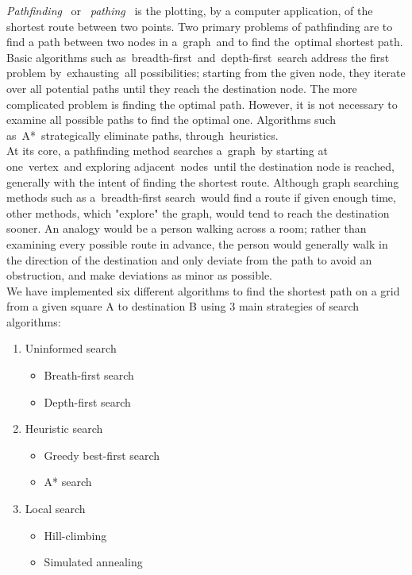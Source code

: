 \documentclass[a4paper]{article}
\begin{document}
\emph{Pathfinding}  or  \emph{pathing}  is the plotting, by a computer application, of the shortest route between two points. Two primary problems of pathfinding are to find a path between two nodes in a graph and to find the optimal shortest path. Basic algorithms such as breadth-first and depth-first search address the first problem by exhausting all possibilities; starting from the given node, they iterate over all potential paths until they reach the destination node. The more complicated problem is finding the optimal path. However, it is not necessary to examine all possible paths to find the optimal one. Algorithms such as A* strategically eliminate paths, through heuristics.\\

At its core, a pathfinding method searches a graph by starting at one vertex and exploring adjacent nodes until the destination node is reached, generally with the intent of finding the shortest route. Although graph searching methods such as a breadth-first search would find a route if given enough time, other methods, which "explore" the graph, would tend to reach the destination sooner. An analogy would be a person walking across a room; rather than examining every possible route in advance, the person would generally walk in the direction of the destination and only deviate from the path to avoid an obstruction, and make deviations as minor as possible.\\

We have implemented six different algorithms to find the shortest path on a grid from a given square A to destination B using 3 main strategies of search algorithms:\\

\begin{enumerate}
\item Uninformed search
	\begin{itemize}
		\item Breath-first search
		\item Depth-first search
	\end{itemize}
\item Heuristic search
	\begin{itemize}
		\item Greedy best-first search
		\item A* search
	\end{itemize}
\item Local search
	\begin{itemize}
		\item Hill-climbing
		\item Simulated annealing
	\end{itemize}
\end{enumerate}
\end{document}
